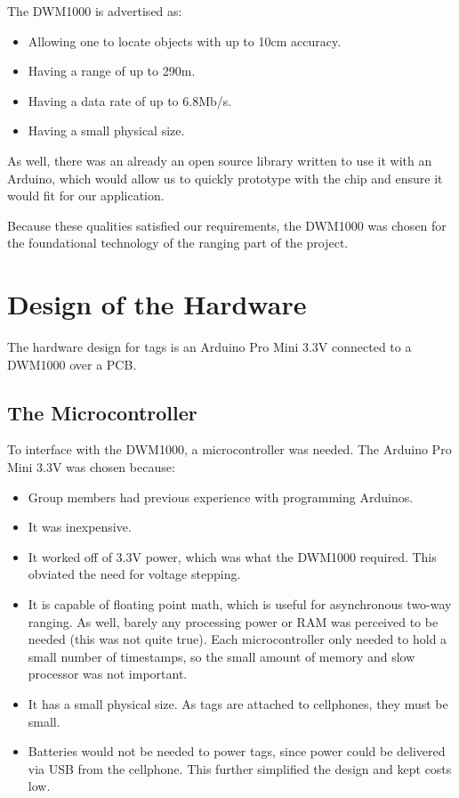 The DWM1000 is advertised as:
\begin{itemize}
	\item Allowing one to locate objects with up to 10cm accuracy.
	\item Having a range of up to 290m.
	\item Having a data rate of up to 6.8Mb/s.
	\item Having a small physical size. 
\end{itemize}

As well, there was an already an open source library written to use it with an Arduino, which would allow us to quickly prototype with the chip and ensure it would fit for our application.

Because these qualities satisfied our requirements, the DWM1000 was chosen for the foundational technology of the ranging part of the project. 

\section{Design of the Hardware}
The hardware design for tags is an Arduino Pro Mini 3.3V connected to a DWM1000 over a PCB. 

\subsection{The Microcontroller}
To interface with the DWM1000, a microcontroller was needed. The Arduino Pro Mini 3.3V was chosen because:
\begin{itemize}
	\item Group members had previous experience with programming Arduinos.
	\item It was inexpensive.
	\item It worked off of 3.3V power, which was what the DWM1000 required. This obviated the need for voltage stepping.
	\item It is capable of floating point math, which is useful for asynchronous two-way ranging. As well, barely any processing power or RAM was perceived to be needed (this was not quite true). Each microcontroller only needed to hold a small number of timestamps, so the small amount of memory and slow processor was not important.
	\item It has a small physical size. As tags are attached to cellphones, they must be small.
	\item Batteries would not be needed to power tags, since power could be delivered via USB from the cellphone. This further simplified the design and kept costs low.
\end{itemize}


